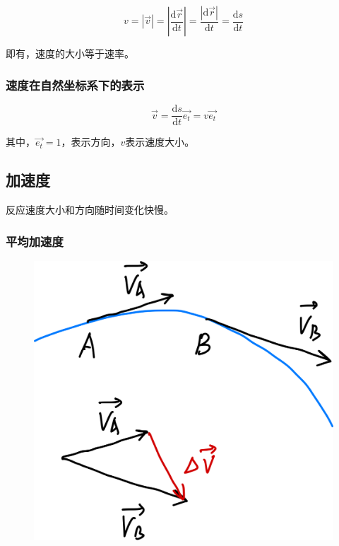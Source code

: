 \documentclass[12pt, a4paper]{article}
\newcommand{\rmd}{\mathrm{d}}
\begin{document}
    \[
        v = \left|\overrightarrow{v}\right| =
        \left|\frac{\rmd \overrightarrow{r}}{\rmd t}\right|
        = \frac{\left|\rmd \overrightarrow{r}\right|}{\rmd t}
        = \frac{\rmd s}{\rmd t}
    \]

    即有，速度的大小等于速率。

\subsubsection{速度在自然坐标系下的表示}

    \[
        \overrightarrow{v} = \frac{\rmd s}{\rmd t}\overrightarrow{e_{t}}
        = v \overrightarrow{e_{t}}
    \]

    其中，\(\overrightarrow{e_{t}} = 1\)，表示方向，\(v\)表示速度大小。

\subsection{加速度}

    反应速度大小和方向随时间变化快慢。

\subsubsection{平均加速度}

    \begin{figure}
        \centering
        \includegraphics[scale=0.08]{"Chapter 01 images/pic6.png"}
        \label{pic6}
    \end{figure}
\end{document}
